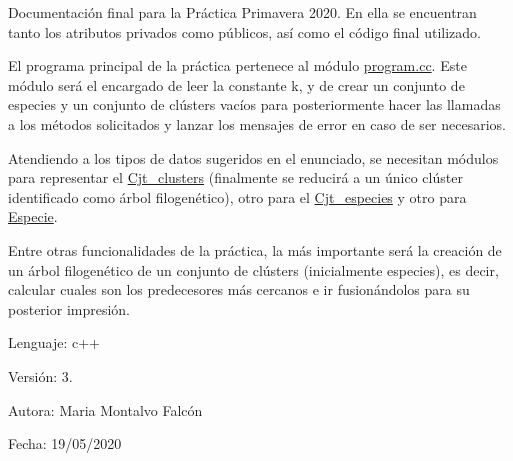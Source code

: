 Documentación final para la Práctica Primavera 2020. En ella se encuentran tanto los atributos privados como públicos, así como el código final utilizado.

El programa principal de la práctica pertenece al módulo \mbox{\hyperlink{program_8cc}{program.\+cc}}. Este módulo será el encargado de leer la constante k, y de crear un conjunto de especies y un conjunto de clústers vacíos para posteriormente hacer las llamadas a los métodos solicitados y lanzar los mensajes de error en caso de ser necesarios.

Atendiendo a los tipos de datos sugeridos en el enunciado, se necesitan módulos para representar el \mbox{\hyperlink{class_cjt__clusters}{Cjt\+\_\+clusters}} (finalmente se reducirá a un único clúster identificado como árbol filogenético), otro para el \mbox{\hyperlink{class_cjt__especies}{Cjt\+\_\+especies}} y otro para \mbox{\hyperlink{class_especie}{Especie}}.

Entre otras funcionalidades de la práctica, la más importante será la creación de un árbol filogenético de un conjunto de clústers (inicialmente especies), es decir, calcular cuales son los predecesores más cercanos e ir fusionándolos para su posterior impresión.

Lenguaje\+: c++

Versión\+: 3.

Autora\+: Maria Montalvo Falcón

Fecha\+: 19/05/2020 